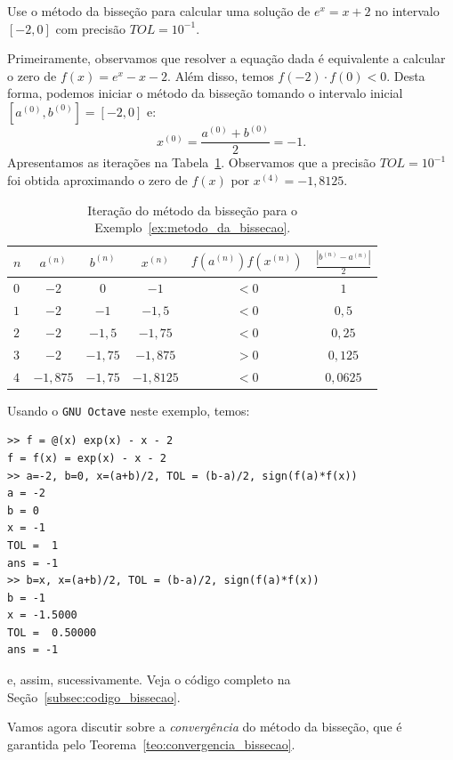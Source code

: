\begin{ex}
\begin{ex}\label{ex:metodo_da_bissecao}Use o método da bisseção para calcular uma solução de $e^x = x + 2$ no intervalo $[-2, 0]$ com precisão $TOL = 10^{-1}$.
\end{ex}
\begin{sol}
  Primeiramente, observamos que resolver a equação dada é equivalente a calcular o zero de $f(x) = e^x - x - 2$. Além disso, temos $f(-2)\cdot f(0) < 0$. Desta forma, podemos iniciar o método da bisseção tomando o intervalo inicial $[a^{(0)}, b^{(0)}] = [-2, 0]$ e:
  \begin{equation}
    x^{(0)} = \frac{a^{(0)} + b^{(0)}}{2} = -1.
  \end{equation}
  Apresentamos as iterações na Tabela~\ref{tab:metodo_da_bissecao}. Observamos que a precisão $TOL = 10^{-1}$ foi obtida aproximando o zero de $f(x)$ por $x^{(4)} = -1,8125$.
  \begin{table}
    \centering
    \caption{Iteração do método da bisseção para o Exemplo~\ref{ex:metodo_da_bissecao}.}
    \label{tab:metodo_da_bissecao}
    \begin{tabular}{l|ccc|c|c}\hline
      $n$ & $a^{(n)}$ & $b^{(n)}$ & $x^{(n)}$ & $f(a^{(n)})f(x^{(n)})$ & $\displaystyle \frac{|b^{(n)}-a^{(n)}|}{2}$\\\hline
      $0$ & $-2$ & $0$ & $-1$ & $< 0$ & $1$\\
      $1$ & $-2$ & $-1$ & $-1,5$ & $<0$ & $0,5$\\
      $2$ & $-2$ & $-1,5$ & $-1,75$ & $<0$ & $0,25$\\
      $3$ & $-2$ & $-1,75$ & $-1,875$ & $>0$ & $0,125$\\
      $4$ & $-1,875$ & $-1,75$ & $-1,8125$ & $<0$ & $0,0625$\\\hline
    \end{tabular}
  \end{table}

Usando o \verb+GNU Octave+ neste exemplo, temos:
\begin{verbatim}
>> f = @(x) exp(x) - x - 2
f = f(x) = exp(x) - x - 2
>> a=-2, b=0, x=(a+b)/2, TOL = (b-a)/2, sign(f(a)*f(x))
a = -2
b = 0
x = -1
TOL =  1
ans = -1
>> b=x, x=(a+b)/2, TOL = (b-a)/2, sign(f(a)*f(x))
b = -1
x = -1.5000
TOL =  0.50000
ans = -1
\end{verbatim}
e, assim, sucessivamente. Veja o código completo na Seção~\ref{subsec:codigo_bissecao}.
\end{sol}

Vamos agora discutir sobre a \emph{convergência} do método da bisseção, que é garantida pelo Teorema~\ref{teo:convergencia_bissecao}.


\end{ex}
